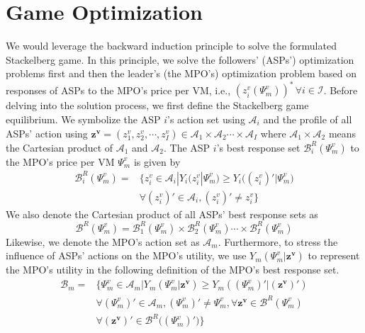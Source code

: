 \documentclass[conference]{IEEEtran}
\begin{document}
\section{Game Optimization} \label{sec:game_optimization}
We would leverage the backward induction principle to solve the formulated Stackelberg game. In this principle, we solve the followers' (ASPs') optimization problems first and then the leader's (the MPO's) optimization problem based on responses of ASPs to the MPO's price per VM, i.e., $(z_i^v(\Psi_m^v))^* \, \forall i \in \mathcal{I}$. Before delving into the solution process, we first define the Stackelberg game equilibrium. We symbolize the ASP $i$'s action set using $\mathcal{A}_i$ and the profile of all ASPs' action using $\bm{z^v}=(z_1^v, z_2^v, \cdots, z_I^v) \in \mathcal{A}_1 \times \mathcal{A}_2 \cdots \times \mathcal{A}_I$ where $\mathcal{A}_1 \times \mathcal{A}_2$ means the Cartesian product of $\mathcal{A}_1$ and $\mathcal{A}_2$. The ASP $i$'s best response set $\mathcal{B}_i^R(\Psi_m^v)$ to the MPO's price per VM $\Psi_m^v$ is given by
\begin{equation} \label{eqn:asp_best_response}
\begin{aligned}
\mathcal{B}_i^R(\Psi_m^v) = &\{z_i^v \in \mathcal{A}_i |Y_i(z_i^v|\Psi_m^v) \geq Y_i\big((z_i^v)'|\Psi_m^v\big) \\
&\forall (z_i^v)' \in \mathcal{A}_i, (z_i^v)' \neq z_i^v\}
\end{aligned}
\end{equation}
We also denote the Cartesian product of all ASPs' best response sets as
\begin{equation}
\mathcal{B}^R(\Psi_m^v) = \mathcal{B}_1^R(\Psi_m^v) \times \mathcal{B}_2^R(\Psi_m^v) \cdots \times \mathcal{B}_I^R(\Psi_m^v)
\end{equation}
Likewise, we denote the MPO's action set as $\mathcal{A}_m$. Furthermore, to stress the influence of ASPs' actions on the MPO's utility, we use $Y_m(\Psi_m^v|\bm{z^v})$ to represent the MPO's utility in the following definition of the MPO's best response set.
\begin{equation} \label{eqn:mpo_best_response}
\begin{aligned}
\mathcal{B}_m = &\{\Psi_m^v \in \mathcal{A}_m| Y_m(\Psi_m^v|\bm{z^v}) \geq Y_m((\Psi_m^v)'|(\bm{z^v})') \\
&\forall (\Psi_m^v)' \in \mathcal{A}_m, (\Psi_m^v)' \neq \Psi_m^v, \forall \bm{z^v} \in \mathcal{B}^R(\Psi_m^v) \\
&\forall  (\bm{z^v})' \in \mathcal{B}^R\big((\Psi_m^v)'\big)\}
\end{aligned}
\end{equation}
\end{document}
